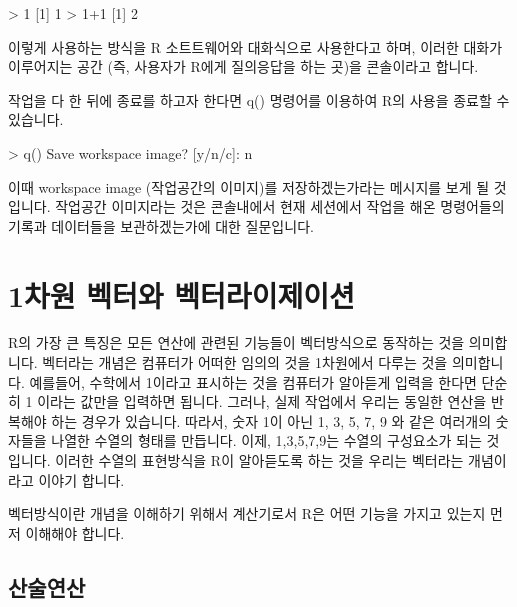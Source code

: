 \begin{Schunk}
\begin{Soutput}
> 1
[1] 1
> 1+1
[1] 2
\end{Soutput}
\end{Schunk}

이렇게 사용하는 방식을 R 소트트웨어와 대화식으로 사용한다고 하며, 이러한 대화가 이루어지는 공간 (즉, 사용자가 R에게 질의응답을 하는 곳)을 콘솔이라고 합니다.


작업을 다 한 뒤에 종료를 하고자 한다면 q() 명령어를 이용하여 R의 사용을 종료할 수 있습니다. 

\begin{Schunk}
\begin{Soutput}
> q()
Save workspace image? [y/n/c]: n
\end{Soutput}
\end{Schunk}

이때 workspace image (작업공간의 이미지)를 저장하겠는가라는 메시지를 보게 될 것입니다. 
작업공간 이미지라는 것은 콘솔내에서 현재 세션에서 작업을 해온 명령어들의 기록과 데이터들을 보관하겠는가에 대한 질문입니다. 


\section{1차원 벡터와 벡터라이제이션}

R의 가장 큰 특징은 모든 연산에 관련된 기능들이 벡터방식으로 동작하는 것을 의미합니다. 
벡터라는 개념은 컴퓨터가 어떠한 임의의 것을 1차원에서 다루는 것을 의미합니다.
예를들어, 수학에서 1이라고 표시하는 것을 컴퓨터가 알아듣게 입력을 한다면 단순히 1 이라는 값만을 입력하면 됩니다. 
그러나, 실제 작업에서 우리는 동일한 연산을 반복해야 하는 경우가 있습니다. 
따라서, 숫자 1이 아닌 1, 3, 5, 7, 9 와 같은 여러개의 숫자들을 나열한 수열의 형태를 만듭니다. 
이제, 1,3,5,7,9는 수열의 구성요소가 되는 것입니다. 
이러한 수열의 표현방식을 R이 알아듣도록 하는 것을 우리는 벡터라는 개념이라고 이야기 합니다. 

벡터방식이란 개념을 이해하기 위해서 계산기로서 R은 어떤 기능을 가지고 있는지 먼저 이해해야 합니다.

\subsection{산술연산}

